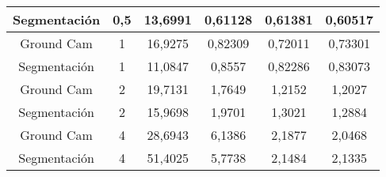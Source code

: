 \begin{table}[h]
\begin{tabular}{|c|c|c|c|c|c|}
Segmentación  & 0,5                                                           & 13,6991                                                         & 0,61128                                                         & 0,61381                                                         & 0,60517                                                         \\ \hline
Ground Cam    & 1                                                             & 16,9275                                                         & 0,82309                                                         & 0,72011                                                         & 0,73301                                                         \\ \hline
Segmentación  & 1                                                             & 11,0847                                                         & 0,8557                                                          & 0,82286                                                         & 0,83073                                                         \\ \hline
Ground Cam    & 2                                                             & 19,7131                                                         & 1,7649                                                          & 1,2152                                                          & 1,2027                                                          \\ \hline
Segmentación  & 2                                                             & 15,9698                                                         & 1,9701                                                          & 1,3021                                                          & 1,2884                                                          \\ \hline
Ground Cam    & 4                                                             & 28,6943                                                         & 6,1386                                                          & 2,1877                                                          & 2,0468                                                          \\ \hline
Segmentación  & 4                                                             & 51,4025                                                         & 5,7738                                                          & 2,1484                                                          & 2,1335                                                          \\ \hline

\end{tabular}
\end{table}
